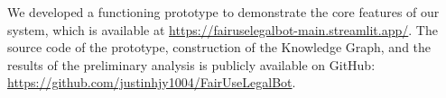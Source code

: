 We developed a functioning prototype to demonstrate the core features of our system, which is available at \href{https://fairuselegalbot-main.streamlit.app/}{https://fairuselegalbot-main.streamlit.app/}. The source code of the prototype, construction of the Knowledge Graph, and the results of the preliminary analysis is publicly available on GitHub: \href{https://github.com/justinhjy1004/FairUseLegalBot}{https://github.com/justinhjy1004/FairUseLegalBot}.